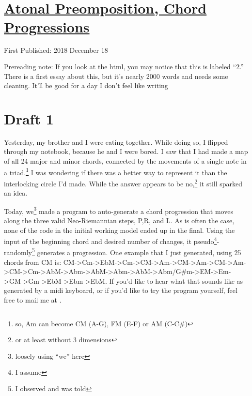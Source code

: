 \documentclass[12pt]{article}[titlepage]
\newcommand{\say}[1]{``#1''}
\newcommand{\1}{\={a}}
\newcommand{\2}{\={e}}
\newcommand{\3}{\={\i}}
\newcommand{\4}{\=o}
\newcommand{\5}{\=u}
\newcommand{\6}{\={A}}
\renewcommand{\,}{\textsuperscript{,}}
\begin{document}
\doublespacing
\section{\href{atonal-precomposition-2.html}{Atonal Preomposition, Chord Progressions}}
First Published: 2018 December 18

Prereading note: If you look at the html, you may notice that this is labeled \say{2.}
There is a first essay about this, but it's nearly 2000 words and needs some cleaning.
It'll be good for a day I don't feel like writing
\section{Draft 1}
Yesterday, my brother and I were eating together.
While doing so, I flipped through my notebook, because he and I were bored.
I saw that I had made a map of all 24 major and minor chords, connected by the movements of a single note in a triad.\footnote{so, Am can become CM (A-G), FM (E-F) or AM (C-C\#)}
I was wondering if there was a better way to represent it than the interlocking circle I'd made.
While the answer appears to be no,\footnote{or at least without 3 dimensions} it still sparked an idea.

Today, we\footnote{loosely using \say{we} here} made a program to auto-generate a chord progression that moves along the three valid Neo-Riemannian steps, P,R, and L.
As is often the case, none of the code in the initial working model ended up in the final.
Using the input of the beginning chord and desired number of changes, it pseudo\footnote{I assume}-randomly\footnote{I observed and was told} generates a progression.
One example that I just generated, using 25 chords from CM is: CM->Cm->EbM->Cm->CM->Am->CM->Am->CM->Am->CM->Cm->AbM->Abm->AbM->Abm->AbM->Abm/G\#m->EM->Em->GM->Gm->EbM->Ebm->EbM.
If you'd like to hear what that sounds like as generated by a midi keyboard, or if you'd like to try the program yourself, feel free to mail me at .
\end{document}
